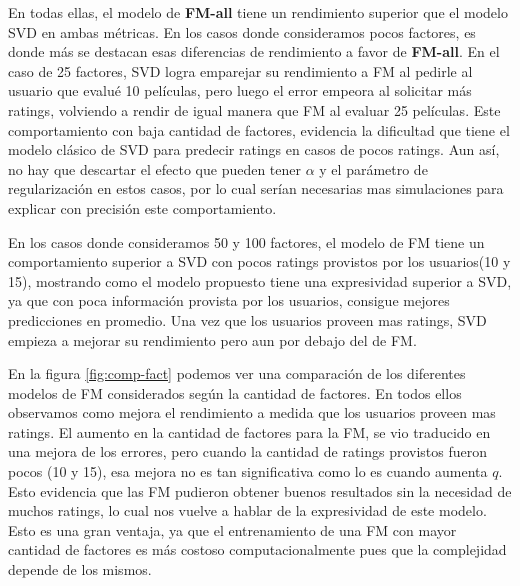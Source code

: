 \documentclass[hidelinks,12pt,a4paper]{book}
\theoremstyle{plain}
\theoremstyle{definition}
\begin{document}
En todas ellas, el modelo de \textbf{FM-all} tiene un rendimiento superior que el modelo SVD en ambas métricas. En los casos donde consideramos pocos factores, es donde más se destacan esas diferencias de rendimiento a favor de \textbf{FM-all}. En el caso de 25 factores, SVD logra emparejar su rendimiento a FM al pedirle al usuario que evalué 10 películas, pero luego el error empeora al solicitar más ratings, volviendo a rendir de igual manera que FM al evaluar 25 películas. Este comportamiento con baja cantidad de factores, evidencia la dificultad que tiene el modelo clásico de SVD para predecir ratings en casos de pocos ratings. Aun así, no hay que descartar el efecto que pueden tener $\alpha$ y el parámetro de regularización en estos casos, por lo cual serían necesarias mas simulaciones para explicar con precisión este comportamiento.

En los casos donde consideramos 50 y 100 factores, el modelo de FM tiene un comportamiento superior a SVD con pocos ratings provistos por los usuarios(10 y 15), mostrando como el modelo propuesto tiene una expresividad superior a SVD, ya que con poca información provista por los usuarios, consigue mejores predicciones en promedio. Una vez que los usuarios proveen mas ratings, SVD empieza a mejorar su rendimiento pero aun por debajo del de FM.

En la figura \ref{fig:comp-fact} podemos ver una comparación de los diferentes modelos de FM considerados según la cantidad de factores. En todos ellos observamos como mejora el rendimiento a medida que los usuarios proveen mas ratings. El aumento en la cantidad de factores para la FM, se vio traducido en una mejora de los errores, pero cuando la cantidad de ratings provistos fueron pocos (10 y 15), esa mejora no es tan significativa como lo es cuando aumenta $q$. Esto evidencia que las FM pudieron obtener buenos resultados sin la necesidad de muchos ratings, lo cual nos vuelve a hablar de la expresividad de este modelo. Esto es una gran ventaja, ya que el entrenamiento de una FM con mayor cantidad de factores es más costoso computacionalmente pues que la complejidad depende de los mismos.
\end{document}
